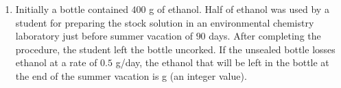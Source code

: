 \documentclass[journal]{IEEEtran}
\numberwithin{equation}{enumi}
\numberwithin{figure}{enumi}
\begin{document}
\begin{enumerate}[start=1, label={Q\arabic*.}]
 \vspace{0.3cm}
\item Initially a bottle contained $400$ g of ethanol. Half of ethanol was used by a student for
preparing the stock solution in an environmental chemistry laboratory just before summer
vacation of $90$ days. After completing the procedure, the student left the bottle uncorked.
If the unsealed bottle losses ethanol at a rate of $0.5$ g/day, the ethanol that will be left in
the bottle at the end of the summer vacation is \underline{\hspace{1.5cm}} g (an integer value).

 \end{enumerate}
\end{document}
